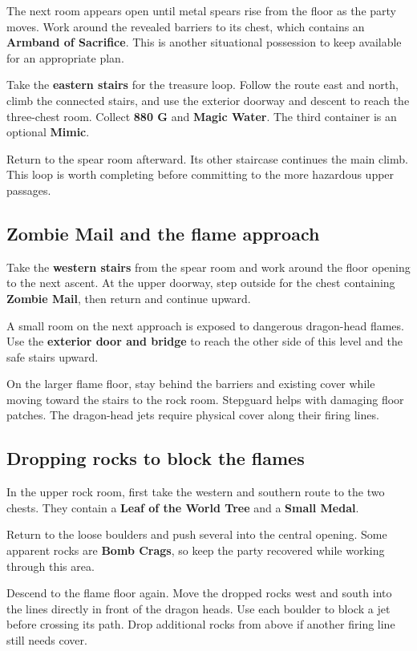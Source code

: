 The next room appears open until metal spears rise from the floor
as the party moves. Work around the revealed barriers to its chest,
which contains an \textbf{Armband of Sacrifice}. This is another
situational possession to keep available for an appropriate plan.

Take the \textbf{eastern stairs} for the treasure loop. Follow
the route east and north, climb the connected stairs, and use the
exterior doorway and descent to reach the three-chest room.
Collect \textbf{880 G} and \textbf{Magic Water}. The third
container is an optional \textbf{Mimic}.

Return to the spear room afterward. Its other staircase continues
the main climb. This loop is worth completing before committing
to the more hazardous upper passages.

\subsection*{Zombie Mail and the flame approach}

Take the \textbf{western stairs} from the spear room and work
around the floor opening to the next ascent. At the upper doorway,
step outside for the chest containing \textbf{Zombie Mail}, then
return and continue upward.

A small room on the next approach is exposed to dangerous dragon-head
flames. Use the \textbf{exterior door and bridge} to reach the
other side of this level and the safe stairs upward.

On the larger flame floor, stay behind the barriers and existing
cover while moving toward the stairs to the rock room. Stepguard
helps with damaging floor patches. The dragon-head jets require
physical cover along their firing lines.

\subsection*{Dropping rocks to block the flames}

In the upper rock room, first take the western and southern route
to the two chests. They contain a \textbf{Leaf of the World Tree}
and a \textbf{Small Medal}.

Return to the loose boulders and push several into the central
opening. Some apparent rocks are \textbf{Bomb Crags}, so keep
the party recovered while working through this area.

Descend to the flame floor again. Move the dropped rocks west and
south into the lines directly in front of the dragon heads. Use
each boulder to block a jet before crossing its path. Drop additional
rocks from above if another firing line still needs cover.

